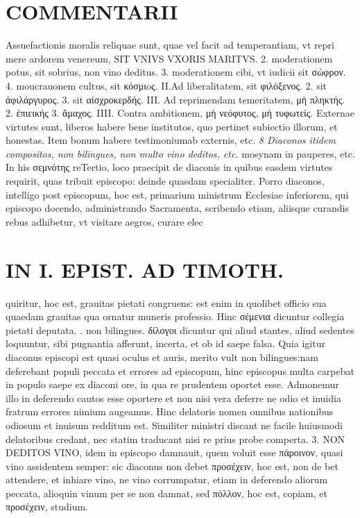 \documentclass{article}
\begin{document}
\begin{pages}
\section*{COMMENTARII }
\marginpar{[ p.70 ]}\pstart Assuefactionis moralis reliquae sunt, quae vel facit ad temperantiam, vt repri mere ardorem venereum, SIT VNIVS VXORIS MARITVS. 2. moderationem potus, sit sobrius, non vino deditus. 3. moderationem cibi, vt iudicii sit σώφρον. 4. moucrauonem cultus, sit κόσμιoς.  \pend\pstart II.Ad liberalitatem, sit φιλόξενος. 2. sit ἀφιλάργυρος. 3. sit αἰσχροκερδής.  \pend\pstart III. Ad reprimendam temeritatem, μἡ πληκτής. 2. ἐπιεικής 3. ἄμαχος.  \pend\pstart IIII. Contra ambitionem, μὴ νεόφυτος, μὴ τυφωτείς.  \pend\pstart Externae virtutes sunt, liberos habere bene institutos, quo pertinet subiectio illorum, et honestas. Item bonum habere testimoniumab externis, etc.  \pend
\textit{8 Diaconos itidem compositos, non bilingues, non multo vino deditos, etc. }\pstart mosynam in pauperes, etc. In his σεμνότης reTertio, loco praecipit de diaconis in quibus easdem virtutes requirit, quas tribuit episcopo: deinde quasdam specialiter. Porro diaconos, intelligo post episcopum, hoc est, primarium ministrum Ecclesiae inferiorem, qui episcopo docendo, administrando Sacramenta, scribendo etiam, aliisque curandis rebus adhibetur, vt visitare aegros, curare elec\pend
\section*{IN I. EPIST. AD TIMOTH. }
\marginpar{[ p.75 ]}\pstart quiritur, hoc est, grauitas pietati congruens: est enim in quolibet officio sua quaedam grauitas qua ornatur muneris professio. Hinc σέμενια dicuntur collegia pietati deputata.  \pend{}. non bilingues. δίλογοι dicuntur qui aliud stantes, aliud sedentes loquuntur, sibi pugnantia afferunt, incerta, et ob id saepe falsa. Quia igitur diaconus episcopi est quasi oculus et auris, merito vult non bilingues:nam deferebant populi peccata et errores ad episcopum, hinc episcopus multa carpebat in populo saepe ex diaconi ore, in qua re prudentem oportet esse. Admonemur illo in deferendo cautos esse oportere et non nisi vera deferre ne odio et inuidia fratrum errores nimium augeamus. Hinc delatoris nomen omnibus nationibus odiosum et inuisum redditum est.  \pend\pstart Similiter ministri discant ne facile huiusmodi delatoribus credant, nec statim traducant nisi re prius probe comperta. 3. NON DEDITOS VINO, idem in episcopo damnauit, quem voluit esse πάροινον, quasi vino assidentem semper: sic diaconus non debet προσέχειν, hoc est, non de bet attendere, et inhiare vino, ne vino corrumpatur, etiam in deferendo aliorum peccata, alioquin vinum per se non damnat, sed πόλλον, hoc est, copiam, et προσέχειν, studium.  \pend

\end{pages}
\end{document}
